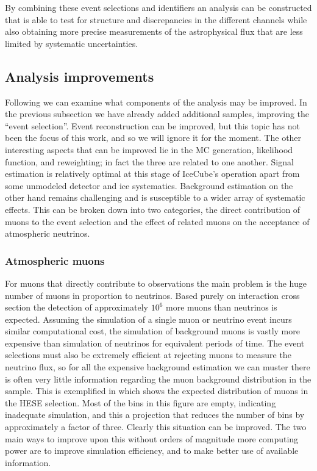 By combining these event selections and identifiers an analysis can be constructed that is able to test for structure and discrepancies in the different channels while also obtaining more precise measurements of the astrophysical flux that are less limited by systematic uncertainties.

\subsection{Analysis improvements}
Following  we can examine what components of the analysis may be improved.
In the previous subsection we have already added additional samples, improving the ``event selection''.
Event reconstruction can be improved, but this topic has not been the focus of this work, and so we will ignore it for the moment.
The other interesting aspects that can be improved lie in the MC generation, likelihood function, and reweighting; in fact the three are related to one another.
Signal estimation is relatively optimal at this stage of IceCube's operation apart from some unmodeled detector and ice systematics.
Background estimation on the other hand remains challenging and is susceptible to a wider array of systematic effects.
This can be broken down into two categories, the direct contribution of muons to the event selection and the effect of related muons on the acceptance of atmospheric neutrinos.

\subsubsection{Atmospheric muons}
For muons that directly contribute to observations the main problem is the huge number of muons in proportion to neutrinos.
Based purely on interaction cross section the detection of approximately $10^6$ more muons than neutrinos is expected.
Assuming the simulation of a single muon or neutrino event incurs similar computational cost, the simulation of background muons is vastly more expensive than simulation of neutrinos for equivalent periods of time.
The event selections must also be extremely efficient at rejecting muons to measure the neutrino flux, so for all the expensive background estimation we can muster there is often very little information regarding the muon background distribution in the sample.
This is exemplified in  which shows the expected distribution of muons in the HESE selection.
Most of the bins in this figure are empty, indicating inadequate simulation, and this a projection that reduces the number of bins by approximately a factor of three.
Clearly this situation can be improved.
The two main ways to improve upon this without orders of magnitude more computing power are to improve simulation efficiency, and to make better use of available information.

